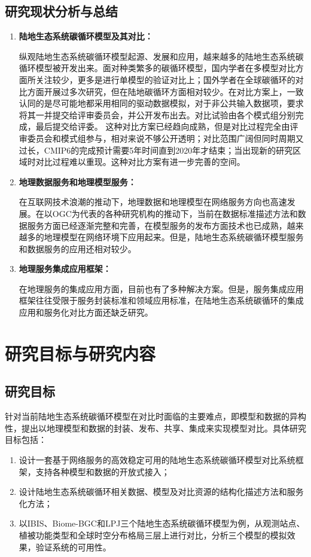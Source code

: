 \subsection{研究现状分析与总结}
\begin{enumerate}[(1)]
\item \textbf{陆地生态系统碳循环模型及其对比：}

纵观陆地生态系统碳循环模型起源、发展和应用，越来越多的陆地生态系统碳循环模型被开发出来。面对种类繁多的碳循环模型，国内学者在多模型对比方面所关注较少，更多是进行单模型的验证对比上；国外学者在全球碳循环的对比方面开展过多次研究，但在陆地碳循环方面相对较少。在对比方案上，一致认同的是尽可能地都采用相同的驱动数据模拟，对于非公共输入数据项，要求将其一并提交给评审委员会，并公开发布出去。对比试验由各个模式组分别完成，最后提交给评委。
这种对比方案已经趋向成熟，但是对比过程完全由评审委员会和模式组参与，相对来说不够公开透明；对比范围广阔但同时周期又过长，CMIP6的完成预计需要5年时间直到2020年才结束；当出现新的研究区域时对比过程难以重现。这种对比方案有进一步完善的空间。  %

\item \textbf{地理数据服务和地理模型服务：}

在互联网技术浪潮的推动下，地理数据和地理模型在网络服务方向也高速发展。在以OGC为代表的各种研究机构的推动下，当前在数据标准描述方法和数据服务方面已经逐渐完整和完善，在模型服务的发布方面技术也已成熟，越来越多的地理模型在网络环境下应用起来。但是，陆地生态系统碳循环模型服务和数据服务的应用还相对较少。

\item \textbf{地理服务集成应用框架：}

在地理服务的集成应用方面，目前也有了多种解决方案。但是，服务集成应用框架往往受限于服务封装标准和领域应用标准，在陆地生态系统碳循环的集成应用和服务化对比方面还缺乏研究。

\end{enumerate}

\section{研究目标与研究内容}
\subsection{研究目标}
针对当前陆地生态系统碳循环模型在对比时面临的主要难点，即模型和数据的异构性，提出以地理模型和数据的封装、发布、共享、集成来实现模型对比。具体研究目标包括：
\begin{enumerate}[(1)]
    \item 设计一套基于网络服务的高效稳定可用的陆地生态系统碳循环模型对比系统框架，支持各种模型和数据的开放式接入；
    \item 设计陆地生态系统碳循环相关数据、模型及对比资源的结构化描述方法和服务化方法；
    \item 以IBIS、Biome-BGC和LPJ三个陆地生态系统碳循环模型为例，从观测站点、植被功能类型和全球时空分布格局三层上进行对比，分析三个模型的模拟效果，验证系统的可用性。
\end{enumerate}

